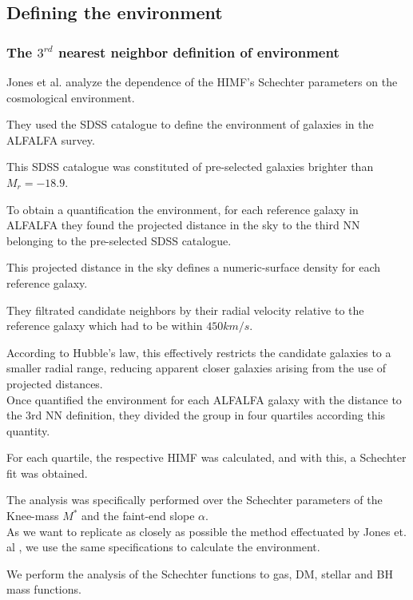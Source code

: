 \documentclass[a4paper,fleqn,usenatbib]{mnras}
\begin{document}
\subsection{Defining the environment}

\subsubsection{The $3^{rd}$ nearest neighbor definition of environment}

Jones et al. \cite{jones1} analyze the dependence of the HIMF's Schechter parameters on the cosmological environment.

They used the SDSS \cite{SDSS} catalogue to define the environment of galaxies in the ALFALFA \cite{ALFALFA} survey.

This SDSS catalogue was constituted of pre-selected galaxies brighter than $M_r = -18.9$.

To obtain a quantification the environment, for each reference galaxy in ALFALFA they found the projected distance in the sky to the third NN belonging to the pre-selected SDSS catalogue.

This projected distance in the sky defines a numeric-surface density for each reference galaxy.

They filtrated candidate neighbors by their radial velocity relative to the reference galaxy which had to be within $450km/s$.

According to Hubble's law, this effectively restricts the candidate galaxies to a smaller radial range, reducing apparent closer galaxies arising from the use of projected distances. \\

Once quantified the environment for each ALFALFA galaxy with the distance to the 3rd NN definition, they divided the group in four quartiles according this quantity. 

For each quartile, the respective HIMF was calculated, and with this, a Schechter fit was obtained. 

The analysis was specifically performed over the Schechter parameters of the Knee-mass $M^*$ and the faint-end slope $\alpha$. \\ 
 
As we want to replicate as closely as possible the method effectuated by Jones et. al \cite{jones1}, we use the same specifications to calculate the environment.

We perform the analysis of the Schechter functions to gas, DM, stellar and BH mass functions.
\end{document}
